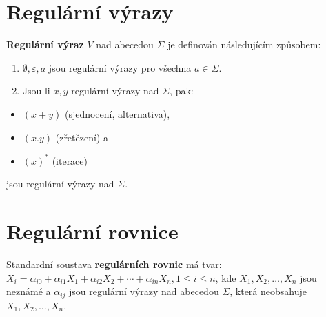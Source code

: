\documentclass{szzclass}
\begin{document}
\section{Regulární výrazy}
\begin{definition}
\textbf{Regulární výraz} $V$ nad abecedou $\Sigma$ je definován následujícím způsobem:
\begin{enumerate}
\item $\emptyset, \varepsilon, a$ jsou regulární výrazy pro všechna $a \in\Sigma$.
\item Jsou-li $x, y$ regulární výrazy nad $\Sigma$, pak:
\end{enumerate}
\begin{itemize}
\item $(x + y)$ (sjednocení, alternativa),
\item $(x.y)$ (zřetězení) a
\item $(x)^*$ (iterace)
\end{itemize}
jsou regulární výrazy nad $\Sigma$.
\end{definition}

\section{Regulární rovnice}
\begin{definition}
Standardní soustava \textbf{regulárních rovnic} má tvar:
$X_i = \alpha_{i0} + \alpha_{i1}X_1 + \alpha_{i2}X_2 + \cdots + \alpha_{in}X_n, 1 \leq i \leq n$, kde $X_1, X_2, \dots , X_n$ jsou neznámé a $\alpha_{ij}$ jsou regulární výrazy nad abecedou $\Sigma$, která neobsahuje $X_1, X_2, \dots , X_n$.
\end{definition}
\end{document}
